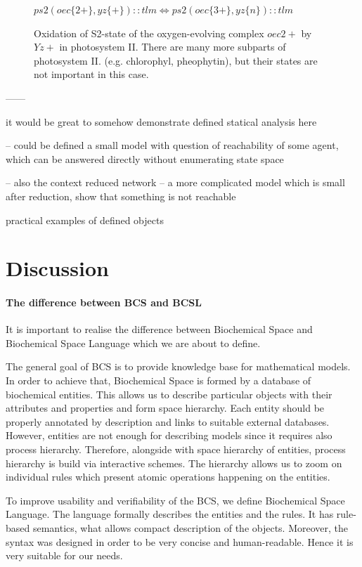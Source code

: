 \documentclass[12pt]{fithesis2}
\begin{document}
\begin{figure}[!h]
{\small
\begin{center}
$ ps2(oec\{2+\}, yz\{+\})::tlm \Leftrightarrow ps2(oec\{3+\}, yz\{n\})::tlm $
\end{center}
}
\caption{Oxidation of S2-state of the oxygen-evolving complex $oec{2+}$ by $Yz{+}$ in photosystem II. There are many more subparts of photosystem II. (e.g. chlorophyl, pheophytin), but their states are not important in this case.}\label{ps2_rule}
\end{figure}

------

it would be great to somehow demonstrate defined statical analysis here

-- could be defined a small model with question of reachability of some agent, which can be answered directly without enumerating state space

-- also the context reduced network -- a more complicated model which is small after reduction, show that something is not reachable

practical examples of defined objects

\chapter{Discussion}

\subsubsection{The difference between BCS and BCSL}

It is important to realise the difference between Biochemical Space and Biochemical Space Language which we are about to define.

The general goal of BCS is to provide knowledge base for mathematical models. In order to achieve that, Biochemical Space is formed by a database of biochemical entities. This allows us to describe particular objects with their attributes and properties and form space hierarchy. Each entity should be properly annotated by description and links to suitable external databases. However, entities are not enough for describing models since it requires also process hierarchy. Therefore, alongside with space hierarchy of entities, process hierarchy is build via interactive schemes. The hierarchy allows us to zoom on individual rules which present atomic operations happening on the entities.

To improve usability and verifiability of the BCS, we define Biochemical Space Language. The language formally describes the entities and the rules. It has rule-based semantics, what allows compact description of the objects. Moreover, the syntax was designed in order to be very concise and human-readable. Hence it is very suitable for our needs.
\end{document}
